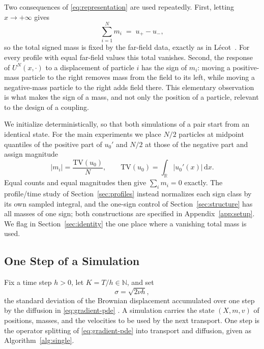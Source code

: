 \documentclass[smallextended,nospthms]{svjour3}
\theoremstyle{plain}
\theoremstyle{definition}
\theoremstyle{remark}
\numberwithin{equation}{section}
\newcommand{\R}{\mathbb{R}}
\begin{document}
Two consequences of \eqref{eq:representation} are used repeatedly. First,
letting $x\to+\infty$ gives
\begin{equation}
 \sum_{i=1}^N m_i \;=\; u_+-u_- ,
 \label{eq:total-mass}
\end{equation}
so the total signed mass is fixed by the far-field data, exactly as in
Lécot~\citep[Eq. (36)]{lecot_rims2001}. For every profile with equal far-field
values this total vanishes. Second, the response of $U^N(x,\cdot)$ to a
displacement of particle $i$ has the sign of $m_i$: moving a positive-mass
particle to the right removes mass from the field to its left, while moving a
negative-mass particle to the right adds field there. This elementary
observation is what makes the sign of a mass, and not only the position of a
particle, relevant to the design of a coupling.

We initialize deterministically, so that both simulations of a pair start from
an identical state. For the main experiments we place $N/2$ particles at
midpoint quantiles of the positive part of $u_0'$ and $N/2$ at those of the
negative part and assign magnitude
\begin{equation}
 |m_i|=\frac{\mathrm{TV}(u_0)}{N},\qquad
 \mathrm{TV}(u_0)=\int_\R |u_0'(x)|\,\mathrm dx .
 \label{eq:mass}
\end{equation}
Equal counts and equal magnitudes then give $\sum_i m_i=0$ exactly. The
profile/time study of Section~\ref{sec:profiles} instead normalizes each sign
class by its own sampled integral, and the one-sign control of
Section~\ref{sec:structure} has all masses of one sign; both constructions are
specified in Appendix~\ref{app:setup}. We flag in Section~\ref{sec:identity}
the one place where a vanishing total mass is used.

\subsection{One Step of a Simulation}
\label{sec:onestep}

Fix a time step $h>0$, let $K=T/h\in\mathbb N$, and set
\begin{equation}
 \sigma=\sqrt{2\nu h},
 \label{eq:sigma}
\end{equation}
the standard deviation of the Brownian displacement accumulated over one step
by the diffusion in \eqref{eq:gradient-pde} \citep{ghoniem1985}. A simulation
carries the state $(X,m,v)$ of positions, masses, and the velocities to be used
by the next transport. One step is the operator splitting of
\eqref{eq:gradient-pde} into transport and diffusion, given as
Algorithm~\ref{alg:single}.
\end{document}
